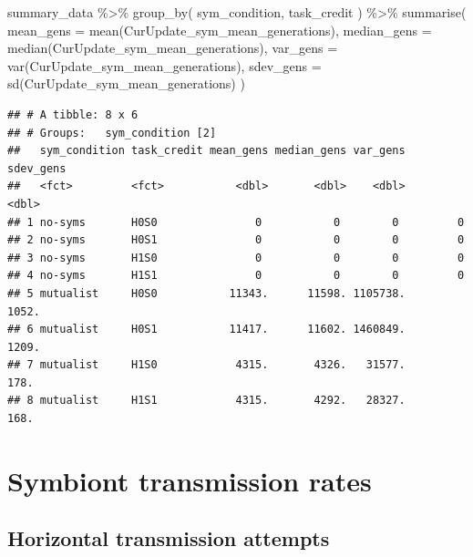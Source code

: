 \documentclass[
]{book}
\newenvironment{Shaded}{\begin{snugshade}}{\end{snugshade}}
\newcommand{\AttributeTok}[1]{\textcolor[rgb]{0.77,0.63,0.00}{#1}}
\newcommand{\FunctionTok}[1]{\textcolor[rgb]{0.00,0.00,0.00}{#1}}
\newcommand{\NormalTok}[1]{#1}
\newcommand{\SpecialCharTok}[1]{\textcolor[rgb]{0.00,0.00,0.00}{#1}}
\begin{document}
\begin{Shaded}
\begin{Highlighting}[]
\NormalTok{summary\_data }\SpecialCharTok{\%\textgreater{}\%}
  \FunctionTok{group\_by}\NormalTok{(}
\NormalTok{    sym\_condition,}
\NormalTok{    task\_credit}
\NormalTok{  ) }\SpecialCharTok{\%\textgreater{}\%}
  \FunctionTok{summarise}\NormalTok{(}
    \AttributeTok{mean\_gens =} \FunctionTok{mean}\NormalTok{(CurUpdate\_sym\_mean\_generations),}
    \AttributeTok{median\_gens =} \FunctionTok{median}\NormalTok{(CurUpdate\_sym\_mean\_generations),}
    \AttributeTok{var\_gens =} \FunctionTok{var}\NormalTok{(CurUpdate\_sym\_mean\_generations),}
    \AttributeTok{sdev\_gens =} \FunctionTok{sd}\NormalTok{(CurUpdate\_sym\_mean\_generations)}
\NormalTok{  )}
\end{Highlighting}
\end{Shaded}

\begin{verbatim}
## # A tibble: 8 x 6
## # Groups:   sym_condition [2]
##   sym_condition task_credit mean_gens median_gens var_gens sdev_gens
##   <fct>         <fct>           <dbl>       <dbl>    <dbl>     <dbl>
## 1 no-syms       H0S0               0           0        0         0 
## 2 no-syms       H0S1               0           0        0         0 
## 3 no-syms       H1S0               0           0        0         0 
## 4 no-syms       H1S1               0           0        0         0 
## 5 mutualist     H0S0           11343.      11598. 1105738.     1052.
## 6 mutualist     H0S1           11417.      11602. 1460849.     1209.
## 7 mutualist     H1S0            4315.       4326.   31577.      178.
## 8 mutualist     H1S1            4315.       4292.   28327.      168.
\end{verbatim}

\hypertarget{symbiont-transmission-rates-5}{%
\section{Symbiont transmission rates}\label{symbiont-transmission-rates-5}}

\hypertarget{horizontal-transmission-attempts-5}{%
\subsection{Horizontal transmission attempts}\label{horizontal-transmission-attempts-5}}
\end{document}
